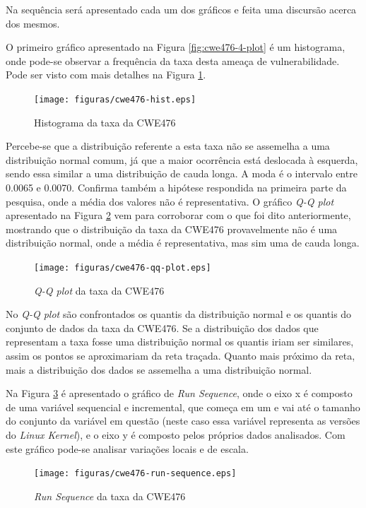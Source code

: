 Na sequência será apresentado cada um dos gráficos e feita uma discursão acerca
dos mesmos.

O primeiro gráfico apresentado na Figura \ref{fig:cwe476-4-plot} é um
histograma, onde pode-se observar a frequência da taxa desta ameaça de
vulnerabilidade. Pode ser visto com mais detalhes na Figura
\ref{fig:cwe476-hist}.

\begin{figure}[h]
  \centering
  \texttt{[image: figuras/cwe476-hist.eps]}
      \caption{Histograma da taxa da CWE476}
      \label{fig:cwe476-hist}
\end{figure}

Percebe-se que a distribuição referente a esta taxa não se assemelha
a uma distribuição normal comum, já que a maior ocorrência está deslocada à
esquerda, sendo essa similar a uma distribuição de cauda longa. A moda é o
intervalo entre 0.0065 e 0.0070. Confirma também a hipótese respondida na
primeira parte da pesquisa, onde a média dos valores não é representativa. O
gráfico \textit{Q-Q plot} apresentado na Figura \ref{fig:cwe476-qq-plot} vem
para corroborar com o que foi dito anteriormente, mostrando que o distribuição
da taxa da CWE476 provavelmente não é uma distribuição normal, onde a média é
representativa, mas sim uma de cauda longa.

\begin{figure}[h]
  \centering
  \texttt{[image: figuras/cwe476-qq-plot.eps]}
      \caption{\textit{Q-Q plot} da taxa da CWE476}
      \label{fig:cwe476-qq-plot}
\end{figure}

No \textit{Q-Q plot} são confrontados os quantis da distribuição normal e os
quantis do conjunto de dados da taxa da CWE476. Se a distribuição dos dados que
representam a taxa fosse uma distribuição normal os quantis iriam ser similares,
assim os pontos se aproximariam da reta traçada. Quanto mais próximo da reta,
mais a distribuição dos dados se assemelha a uma distribuição normal.

Na Figura \ref{fig:cwe476-run-sequence} é apresentado o gráfico de \textit{Run
Sequence}, onde o eixo x é composto de uma variável sequencial e incremental,
que começa em um e vai até o tamanho do conjunto da variável em questão (neste
caso essa variável representa as versões do \textit{Linux Kernel}), e o
eixo y é composto pelos próprios dados analisados. Com este gráfico pode-se
analisar variações locais e de escala.

\begin{figure}[h]
  \centering
  \texttt{[image: figuras/cwe476-run-sequence.eps]}
      \caption{\textit{Run Sequence} da taxa da CWE476}
      \label{fig:cwe476-run-sequence}
\end{figure}

